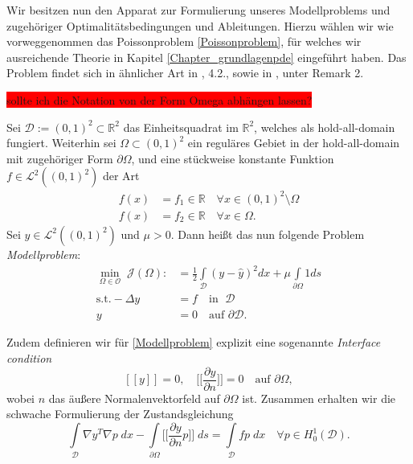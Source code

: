 Wir besitzen nun den Apparat zur Formulierung unseres Modellproblems und zugehöriger Optimalitätsbedingungen und Ableitungen. Hierzu wählen wir wie vorweggenommen das Poissonproblem \ref{Poissonproblem}, für welches wir ausreichende Theorie in Kapitel \ref{Chapter_grundlagenpde} eingeführt haben. Das Problem findet sich in ähnlicher Art in \cite{shape_space}, 4.2., sowie in \cite{LagrangeNewton}, unter Remark 2.

\colorbox{red}{sollte ich die Notation von der Form Omega abhängen lassen?}
\begin{defi}[Modellproblem]
	Sei $\mathcal{D} := (0,1)^2 \subset \mathbb{R}^2$ das Einheitsquadrat im $\mathbb{R}^2$, welches als hold-all-domain fungiert.
	Weiterhin sei $\Omega \subset (0,1)^2$ ein reguläres Gebiet in der hold-all-domain mit zugehöriger Form $\partial\Omega$, und eine stückweise konstante Funktion $f \in \mathcal{L}^2((0,1)^2)$ der Art
	\begin{align*}
		f(x) &= f_1 \in \mathbb{R} \quad \forall x \in (0,1)^2\setminus \Omega \\
		f(x) &= f_2 \in \mathbb{R} \quad \forall x \in \Omega.
	\end{align*}
	Sei $\hat{y} \in \mathcal{L}^2((0,1)^2)$ und $\mu > 0$. Dann heißt das nun folgende Problem \textit{Modellproblem}:
	\begin{equation}\label{Modellproblem}
	\begin{aligned}
	\underset{\Omega\in \mathcal{O}}{\min}\; \mathcal{J}(\Omega) :&= \frac{1}{2}\underset{\mathcal{D}}{\int} (y - \hat{y})^2 dx + \mu\underset{\partial\Omega}{\int} 1 ds \\
	\text{s.t.} -\Delta y &= f \quad \text{in } \;\mathcal{D} \\
	y &= 0  \quad \text{auf } \partial\mathcal{D}.
	\end{aligned}
	\end{equation}		
	
	Zudem definieren wir für \ref{Modellproblem} explizit eine sogenannte \textit{Interface condition}
	\begin{equation}\label{Interfacecondition}
		[[y]] = 0, \quad \Big[\Big[\frac{\partial y}{\partial n}\Big]\Big] = 0 \quad \text{auf } \partial \Omega,
	\end{equation}
	wobei $n$ das äußere Normalenvektorfeld auf $\partial\Omega$ ist.	Zusammen erhalten wir die schwache Formulierung der Zustandsgleichung
	\begin{equation}
		\underset{\mathcal{D}}{\int} \nabla y^T \nabla p\; dx - \underset{\partial\Omega}{\int} \Big[\Big[ \frac{\partial y}{\partial n}p\Big]\Big]\;ds = \underset{\mathcal{D}}{\int} fp \;dx \quad \forall p \in H^1_0(\mathcal{D}).
	\end{equation}
	

\end{defi}
